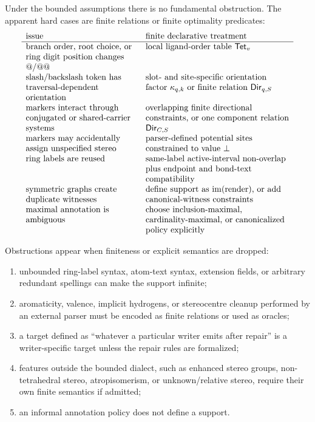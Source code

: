 \documentclass[10pt,a4paper]{article}
\newcommand{\im}{\operatorname{im}}
\newcommand{\render}{\operatorname{render}}
\newcommand{\None}{\bot}
\newcommand{\Dir}{\mathsf{Dir}}
\newcommand{\Tet}{\mathsf{Tet}}
\theoremstyle{definition}
\theoremstyle{remark}
\begin{document}
	Under the bounded assumptions there is no fundamental obstruction.  The
	apparent hard cases are finite relations or finite optimality predicates:
	\[
	\begin{array}{>{\raggedright\arraybackslash}p{0.38\linewidth}
			>{\raggedright\arraybackslash}p{0.49\linewidth}}
		\text{issue} & \text{finite declarative treatment} \\
		\hline
		branch order, root choice, or ring digit position changes \(@\)/\(@@\) & local
		ligand-order table \(\Tet_v\) \\
		slash/backslash token has traversal-dependent orientation & slot- and
		site-specific orientation factor \(\kappa_{q,k}\) or finite relation
		\(\Dir_{q,S}\) \\
		markers interact through conjugated or shared-carrier systems & overlapping
		finite directional constraints, or one component relation \(\Dir_{C,S}\) \\
		markers may accidentally assign unspecified stereo & parser-defined potential
		sites constrained to value \(\None\) \\
		ring labels are reused & same-label active-interval non-overlap plus endpoint
		and bond-text compatibility \\
		symmetric graphs create duplicate witnesses & define support as
		\(\im(\render)\), or add canonical-witness constraints \\
		maximal annotation is ambiguous & choose inclusion-maximal, cardinality-maximal,
		or canonicalized policy explicitly
	\end{array}
	\]

	Obstructions appear when finiteness or explicit semantics are dropped:
	\begin{enumerate}[label=\textup{(O\arabic*)},leftmargin=2.5em]
		\item unbounded ring-label syntax, atom-text syntax, extension fields, or
		arbitrary redundant spellings can make the support infinite;
		\item aromaticity, valence, implicit hydrogens, or stereocentre cleanup performed
		by an external parser must be encoded as finite relations or used as oracles;
		\item a target defined as ``whatever a particular writer emits after repair'' is
		a writer-specific target unless the repair rules are formalized;
		\item features outside the bounded dialect, such as enhanced stereo groups,
		non-tetrahedral stereo, atropisomerism, or unknown/relative stereo, require their
		own finite semantics if admitted;
		\item an informal annotation policy does not define a support.
	\end{enumerate}
\end{document}

